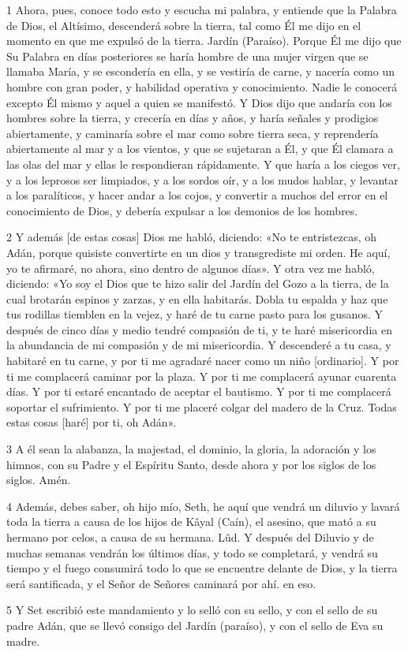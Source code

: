 \par 1 Ahora, pues, conoce todo esto y escucha mi palabra, y entiende que la Palabra de Dios, el Altísimo, descenderá sobre la tierra, tal como Él me dijo en el momento en que me expulsó de la tierra. Jardín (Paraíso). Porque Él me dijo que Su Palabra en días posteriores se haría hombre de una mujer virgen que se llamaba María, y se escondería en ella, y se vestiría de carne, y nacería como un hombre con gran poder, y habilidad operativa y conocimiento. Nadie le conocerá excepto Él mismo y aquel a quien se manifestó. Y Dios dijo que andaría con los hombres sobre la tierra, y crecería en días y años, y haría señales y prodigios abiertamente, y caminaría sobre el mar como sobre tierra seca, y reprendería abiertamente al mar y a los vientos, y que se sujetaran a Él, y que Él clamara a las olas del mar y ellas le respondieran rápidamente. Y que haría a los ciegos ver, y a los leprosos ser limpiados, y a los sordos oír, y a los mudos hablar, y levantar a los paralíticos, y hacer andar a los cojos, y convertir a muchos del error en el conocimiento de Dios, y debería expulsar a los demonios de los hombres.

\par 2 Y además [de estas cosas] Dios me habló, diciendo: «No te entristezcas, oh Adán, porque quisiste convertirte en un dios y transgrediste mi orden. He aquí, yo te afirmaré, no ahora, sino dentro de algunos días». Y otra vez me habló, diciendo: «Yo soy el Dios que te hizo salir del Jardín del Gozo a la tierra, de la cual brotarán espinos y zarzas, y en ella habitarás. Dobla tu espalda y haz que tus rodillas tiemblen en la vejez, y haré de tu carne pasto para los gusanos. Y después de cinco días y medio tendré compasión de ti, y te haré misericordia en la abundancia de mi compasión y de mi misericordia. Y descenderé a tu casa, y habitaré en tu carne, y por ti me agradaré nacer como un niño [ordinario]. Y por ti me complacerá caminar por la plaza. Y por ti me complacerá ayunar cuarenta días. Y por ti estaré encantado de aceptar el bautismo. Y por ti me complacerá soportar el sufrimiento. Y por ti me placeré colgar del madero de la Cruz. Todas estas cosas [haré] por ti, oh Adán».

\par 3 A él sean la alabanza, la majestad, el dominio, la gloria, la adoración y los himnos, con su Padre y el Espíritu Santo, desde ahora y por los siglos de los siglos. Amén.

\par 4 Además, debes saber, oh hijo mío, Seth, he aquí que vendrá un diluvio y lavará toda la tierra a causa de los hijos de Kâyal (Caín), el asesino, que mató a su hermano por celos, a causa de su hermana. Lûd. Y después del Diluvio y de muchas semanas vendrán los últimos días, y todo se completará, y vendrá su tiempo y el fuego consumirá todo lo que se encuentre delante de Dios, y la tierra será santificada, y el Señor de Señores caminará por ahí. en eso.

\par 5 Y Set escribió este mandamiento y lo selló con su sello, y con el sello de su padre Adán, que se llevó consigo del Jardín (paraíso), y con el sello de Eva su madre.

